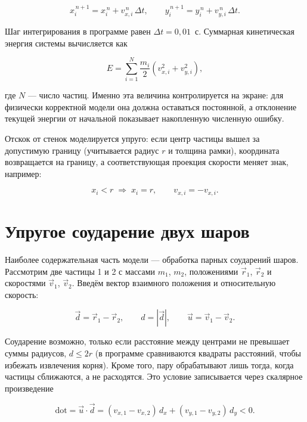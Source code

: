 \documentclass[a4paper]{article}
\newcommand{\subsectiontext}[1]{%
    \section*{\fontsize{13pt}{0pt}\selectfont\textbf{#1}}%
}
\begin{document}
\begin{equation}
    x_i^{\,n+1} = x_i^{\,n} + v_{x,i}^{\,n}\,\Delta t, \qquad
    y_i^{\,n+1} = y_i^{\,n} + v_{y,i}^{\,n}\,\Delta t.
\end{equation}

Шаг интегрирования в программе равен $\Delta t = 0{,}01$~с. Суммарная кинетическая энергия системы вычисляется как

\begin{equation}
    E = \sum_{i=1}^{N} \frac{m_i}{2}\left(v_{x,i}^2 + v_{y,i}^2\right),
\end{equation}

где $N$ --- число частиц. Именно эта величина контролируется на экране: для физически корректной модели она должна оставаться постоянной, а отклонение текущей энергии от начальной показывает накопленную численную ошибку.

Отскок от стенок моделируется упруго: если центр частицы вышел за допустимую границу (учитывается радиус $r$ и толщина рамки), координата возвращается на границу, а соответствующая проекция скорости меняет знак, например:

\begin{equation}
    x_i < r \;\Rightarrow\; x_i = r,\qquad v_{x,i} = -v_{x,i}.
\end{equation}

\subsectiontext{Упругое соударение двух шаров}

Наиболее содержательная часть модели --- обработка парных соударений шаров. Рассмотрим две частицы 1 и 2 с массами $m_1$, $m_2$, положениями $\vec{r}_1$, $\vec{r}_2$ и скоростями $\vec{v}_1$, $\vec{v}_2$. Введём вектор взаимного положения и относительную скорость:

\begin{equation}
    \vec{d} = \vec{r}_1 - \vec{r}_2, \qquad d = |\vec{d}|, \qquad \vec{u} = \vec{v}_1 - \vec{v}_2.
\end{equation}

Соударение возможно, только если расстояние между центрами не превышает суммы радиусов, $d \le 2r$ (в программе сравниваются квадраты расстояний, чтобы избежать извлечения корня). Кроме того, пару обрабатывают лишь тогда, когда частицы сближаются, а не расходятся. Это условие записывается через скалярное произведение

\begin{equation}
    \mathrm{dot} = \vec{u}\cdot\vec{d} = (v_{x,1}-v_{x,2})\,d_x + (v_{y,1}-v_{y,2})\,d_y < 0.
\end{equation}
\end{document}
